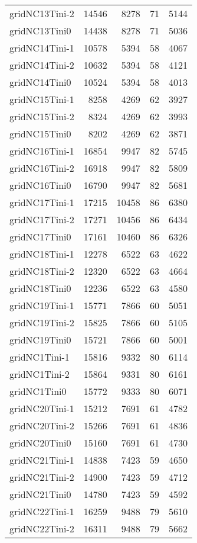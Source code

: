 \documentclass[../../../thesis.tex]{subfiles}
\begin{document}
\begin{longtable}{lrrrr}
gridNC13Tini-2 & 14546 & 8278 & 71 & 5144 \\
gridNC13Tini0 & 14438 & 8278 & 71 & 5036 \\
gridNC14Tini-1 & 10578 & 5394 & 58 & 4067 \\
gridNC14Tini-2 & 10632 & 5394 & 58 & 4121 \\
gridNC14Tini0 & 10524 & 5394 & 58 & 4013 \\
gridNC15Tini-1 & 8258 & 4269 & 62 & 3927 \\
gridNC15Tini-2 & 8324 & 4269 & 62 & 3993 \\
gridNC15Tini0 & 8202 & 4269 & 62 & 3871 \\
gridNC16Tini-1 & 16854 & 9947 & 82 & 5745 \\
gridNC16Tini-2 & 16918 & 9947 & 82 & 5809 \\
gridNC16Tini0 & 16790 & 9947 & 82 & 5681 \\
gridNC17Tini-1 & 17215 & 10458 & 86 & 6380 \\
gridNC17Tini-2 & 17271 & 10456 & 86 & 6434 \\
gridNC17Tini0 & 17161 & 10460 & 86 & 6326 \\
gridNC18Tini-1 & 12278 & 6522 & 63 & 4622 \\
gridNC18Tini-2 & 12320 & 6522 & 63 & 4664 \\
gridNC18Tini0 & 12236 & 6522 & 63 & 4580 \\
gridNC19Tini-1 & 15771 & 7866 & 60 & 5051 \\
gridNC19Tini-2 & 15825 & 7866 & 60 & 5105 \\
gridNC19Tini0 & 15721 & 7866 & 60 & 5001 \\
gridNC1Tini-1 & 15816 & 9332 & 80 & 6114 \\
gridNC1Tini-2 & 15864 & 9331 & 80 & 6161 \\
gridNC1Tini0 & 15772 & 9333 & 80 & 6071 \\
gridNC20Tini-1 & 15212 & 7691 & 61 & 4782 \\
gridNC20Tini-2 & 15266 & 7691 & 61 & 4836 \\
gridNC20Tini0 & 15160 & 7691 & 61 & 4730 \\
gridNC21Tini-1 & 14838 & 7423 & 59 & 4650 \\
gridNC21Tini-2 & 14900 & 7423 & 59 & 4712 \\
gridNC21Tini0 & 14780 & 7423 & 59 & 4592 \\
gridNC22Tini-1 & 16259 & 9488 & 79 & 5610 \\
gridNC22Tini-2 & 16311 & 9488 & 79 & 5662 \\

\end{longtable}
\end{document}

